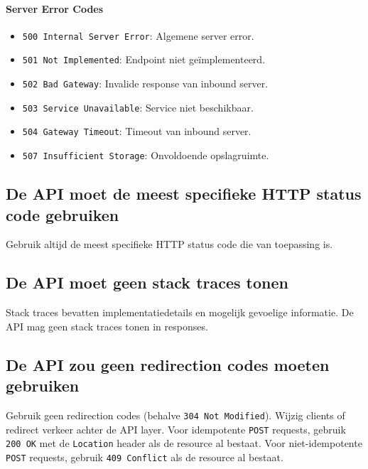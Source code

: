 \paragraph{Server Error Codes}

\begin{itemize}
    \item \texttt{500 Internal Server Error}: Algemene server error.
    \item \texttt{501 Not Implemented}: Endpoint niet geïmplementeerd.
    \item \texttt{502 Bad Gateway}: Invalide response van inbound server.
    \item \texttt{503 Service Unavailable}: Service niet beschikbaar.
    \item \texttt{504 Gateway Timeout}: Timeout van inbound server.
    \item \texttt{507 Insufficient Storage}: Onvoldoende opslagruimte.
\end{itemize}

\subsection{De API moet de meest specifieke HTTP status code gebruiken}
\label{subsection:meest_specifieke_http_status_code}

Gebruik altijd de meest specifieke HTTP status code die van toepassing is.

\subsection{De API moet geen stack traces tonen}
\label{subsection:geen_stack_traces}

Stack traces bevatten implementatiedetails en mogelijk gevoelige informatie. De API mag geen stack traces tonen in responses.

\subsection{De API zou geen redirection codes moeten gebruiken}
\label{subsection:geen_redirects}

Gebruik geen redirection codes (behalve \texttt{304 Not Modified}). Wijzig clients of redirect verkeer achter de API layer. Voor idempotente \texttt{POST} requests, gebruik \texttt{200 OK} met de \texttt{Location} header als de resource al bestaat. Voor niet-idempotente \texttt{POST} requests, gebruik \texttt{409 Conflict} als de resource al bestaat.

